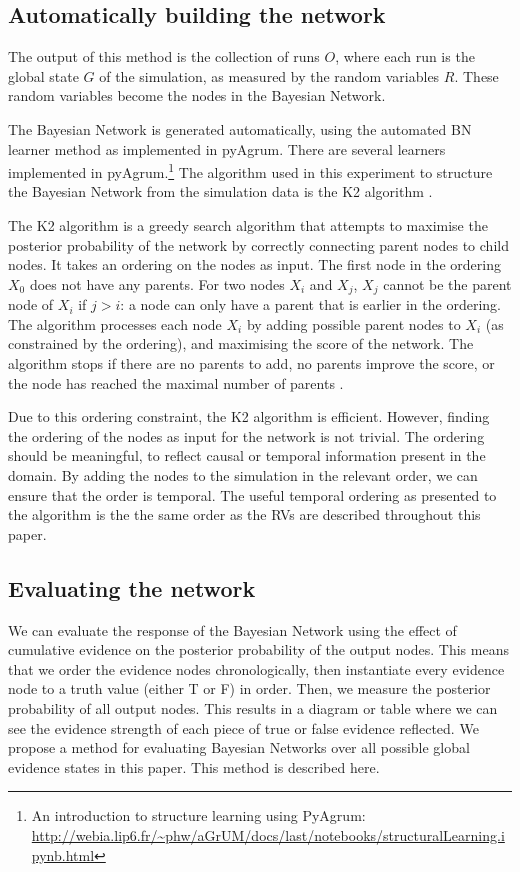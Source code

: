 \documentclass[11pt]{article}
\begin{document}
\subsection{Automatically building the network}

The output of this method is the collection of runs $O$, where each run is the global state $G$ of the simulation, as measured by the random variables $R$. These random variables become the nodes in the Bayesian Network.

The Bayesian Network is generated automatically, using the automated BN learner method as implemented in pyAgrum. There are several learners implemented in pyAgrum.\footnote{An introduction to structure learning using PyAgrum: \url{http://webia.lip6.fr/~phw/aGrUM/docs/last/notebooks/structuralLearning.ipynb.html}} The algorithm used in this experiment to structure the Bayesian Network from the simulation data is the K2 algorithm \citep{Cooper1992}. 

The K2 algorithm is a greedy search algorithm that attempts to maximise the posterior probability of the network by correctly connecting parent nodes to child nodes. It takes an ordering on the nodes as input. The first node in the ordering $X_0$ does not have any parents. For two nodes $X_i$ and $X_j$, $X_j$ cannot be the parent node of $X_i$ if $j > i$: a node can only have a parent that is earlier in the ordering. The algorithm processes each node $X_i$ by adding possible parent nodes to $X_i$ (as constrained by the ordering), and maximising the score of the network. The algorithm stops if there are no parents to add, no parents improve the score, or the node has reached the maximal number of parents \citep{Chen2008}.

Due to this ordering constraint, the K2 algorithm is efficient. However, finding the ordering of the nodes as input for the network is not trivial. The ordering should be meaningful, to reflect causal or temporal information present in the domain. By adding the nodes to the simulation in the relevant order, we can ensure that the order is temporal. The useful temporal ordering as presented to the algorithm is the the same order as the RVs are described throughout this paper. 

\subsection{Evaluating the network}

We can evaluate the response of the Bayesian Network using the effect of cumulative evidence on the posterior probability of the output nodes. This means that we order the evidence nodes chronologically, then instantiate every evidence node to a truth value (either T or F) in order. Then, we measure the posterior probability of all output nodes. This results in a diagram or table where we can see the evidence strength of each piece of true or false evidence reflected. We propose a method for evaluating Bayesian Networks over all possible global evidence states in this paper. This method is described here.
\end{document}
